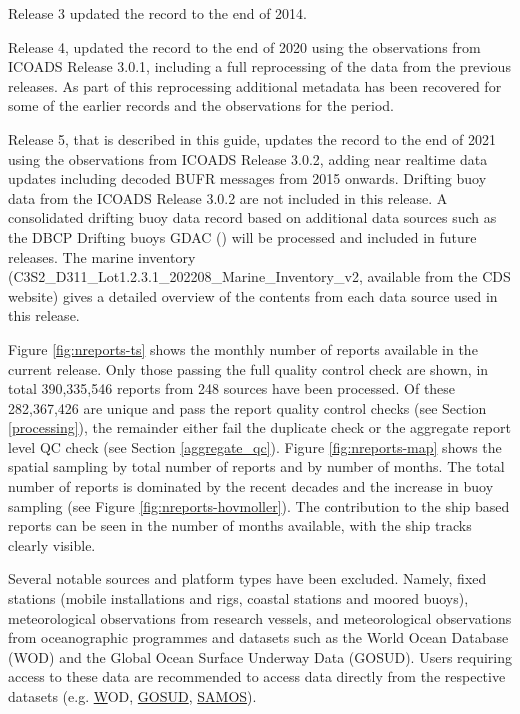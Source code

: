 Release 3 updated the record to the end of 2014. 

Release 4, updated the record to the end of 2020 using the observations from ICOADS Release 3.0.1, including a full reprocessing of the data from the previous releases. As part of this reprocessing additional metadata has been recovered for some of the earlier records and the observations for the period.

Release 5, that is described in this guide, updates the record to the end of 2021 using the observations from ICOADS Release 3.0.2, adding near realtime data updates including decoded BUFR messages from 2015 onwards.
Drifting buoy data from the ICOADS Release 3.0.2 are not included in this release.
A consolidated drifting buoy data record based on additional data sources such as the DBCP Drifting buoys GDAC (\cite{DBCP2022,Coriolis2021}) will be processed and included in future releases.
The marine inventory (C3S2\_D311\_Lot1.2.3.1\_202208\_Marine\_Inventory\_v2, available from the CDS website) gives a detailed overview of the contents from each data source used in this release.

Figure \ref{fig:nreports-ts} shows the monthly number of reports available in the current release. 
Only those passing the full quality control check are shown, in total 390,335,546 reports from 248 sources have been processed.
Of these 282,367,426 are unique and pass the report quality control checks (see Section \ref{processing}), the remainder either fail the duplicate check or the aggregate report level QC check (see Section \ref{aggregate_qc}).
Figure \ref{fig:nreports-map} shows the spatial sampling by total number of reports and by number of months. 
The total number of reports is dominated by the recent decades and the increase in buoy sampling (see Figure \ref{fig:nreports-hovmoller}). 
The contribution to the ship based reports can be seen in the number of months available, with the ship tracks clearly visible.

Several notable sources and platform types have been excluded.
Namely, fixed stations (mobile installations and rigs, coastal stations and moored buoys), meteorological observations from research vessels, and meteorological observations from oceanographic programmes and datasets such as the World Ocean Database (WOD) and the Global Ocean Surface Underway Data (GOSUD). 
Users requiring access to these data are recommended to access data directly from the respective datasets (e.g. \href{https://www.ncei.noaa.gov/access/world-ocean-database-select/dbsearch.html} WOD, \href{http://www.gosud.org/}{GOSUD}, \href{https://samos.coaps.fsu.edu/html/nav.php?s=2}{SAMOS}).

